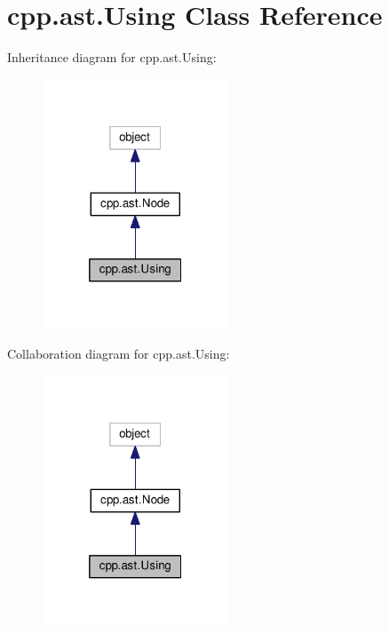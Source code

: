 \hypertarget{classcpp_1_1ast_1_1Using}{}\section{cpp.\+ast.\+Using Class Reference}
\label{classcpp_1_1ast_1_1Using}


Inheritance diagram for cpp.\+ast.\+Using\+:\nopagebreak
\begin{figure}[H]
\begin{center}
\leavevmode
\includegraphics[width=157pt]{classcpp_1_1ast_1_1Using__inherit__graph}
\end{center}
\end{figure}


Collaboration diagram for cpp.\+ast.\+Using\+:\nopagebreak
\begin{figure}[H]
\begin{center}
\leavevmode
\includegraphics[width=157pt]{classcpp_1_1ast_1_1Using__coll__graph}
\end{center}
\end{figure}
